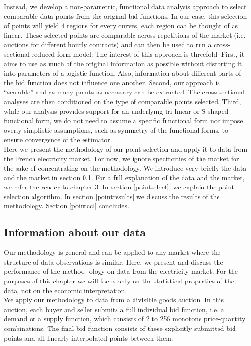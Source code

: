 Instead, we develop a non-parametric, functional data analysis approach to select comparable data points from the original bid functions. In our case, this selection of points will yield 4 regions for every curves, each region can be thought of as linear. These selected points are comparable across repetitions of the market (i.e. auctions for different hourly contracts) and can then be used to run a cross-sectional reduced form model. The interest of this approach is threefold. First, it aims to use as much of the original information as possible without distorting it into parameters of a logistic function. Also, information about different parts of the bid function does not influence one another. Second, our approach is “scalable” and as many points as necessary can be extracted. The cross-sectional analyses are then conditioned on the type of comparable points selected. Third, while our analysis provides support for an underlying tri-linear or S-shaped functional form, we do not need to assume a specific functional form nor impose overly simplistic assumptions, such as symmetry of the functional forms, to ensure convergence of the estimator.\\

Here we present the methodology of our point selection and apply it to data from the French electricity market. For now, we ignore specificities of the market for the sake of concentrating on the methodology. We introduce very briefly the data and the market in section \ref{gleinfo}. For a full explanation of the data and the market, we refer the reader to chapter 3. In section \ref{pointselect}, we explain the point selection algorithm. In section \ref{pointresults} we discuss the results of the methodology. Section \ref{pointccl} concludes.

\subsection{Information about our data}\label{gleinfo}

Our methodology is general and can be applied to any market where the structure of data observations is similar. Here, we present and discuss the performance of the method- ology on data from the electricity market. For the purposes of this chapter we will focus only on the statistical properties of the data, not on the economic interpretation.\\

We apply our methodology to data from a divisible goods auction. In this auction, each buyer and seller submits a full individual bid function, i.e. a demand or a supply function, which consists of 2 to 256 monotone price-quantity combinations. The final bid function consists of these explicitly submitted bid points and all linearly interpolated points between them.\\

